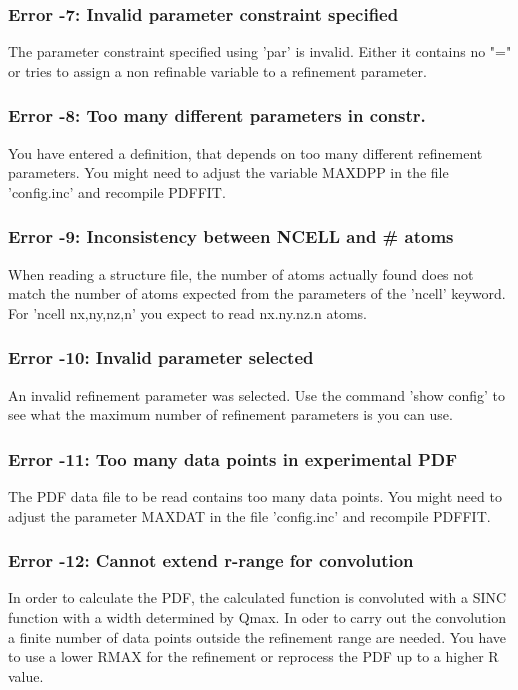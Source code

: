\subsubsection{Error -7: Invalid parameter constraint specified}
\par
The parameter constraint specified using 'par' is invalid. Either 
it contains no "=" or tries to assign a non refinable variable to 
a refinement parameter. 
\subsubsection{Error -8: Too many different parameters in constr.}
\par
You have entered a definition, that depends on too many different 
refinement parameters. You might need to adjust the variable 
MAXDPP in the file 'config.inc' and recompile PDFFIT. 
\subsubsection{Error -9: Inconsistency between NCELL and \# atoms}
\par
When reading a structure file, the number of atoms actually found 
does not match the number of atoms expected from the parameters 
of the 'ncell' keyword. For 'ncell nx,ny,nz,n' you expect to read 
nx.ny.nz.n atoms. 
\subsubsection{Error -10: Invalid parameter selected}
\par
An invalid refinement parameter was selected. Use the command 
'show config' to see what the maximum number of refinement 
parameters is you can use. 
\subsubsection{Error -11: Too many data points in experimental PDF}
\par
The PDF data file to be read contains too many data points. You 
might need to adjust the parameter MAXDAT in the file 'config.inc' 
and recompile PDFFIT. 
\subsubsection{Error -12: Cannot extend r-range for convolution}
\par
In order to calculate the PDF, the calculated function is convoluted 
with a SINC function with a width determined by Qmax. In oder to 
carry out the convolution a finite number of data points outside 
the refinement range are needed. You have to use a lower RMAX for 
the refinement or reprocess the PDF up to a higher R value. 
